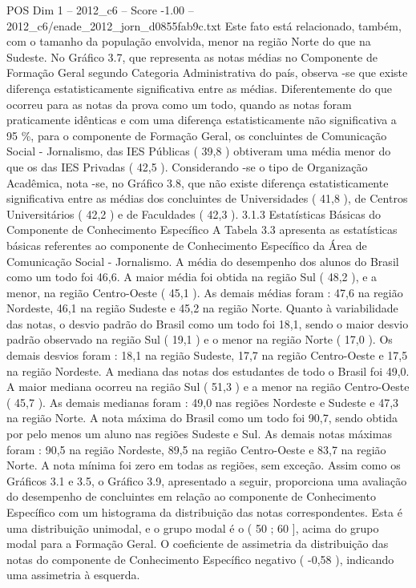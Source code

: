 \begin{textsample}{POS Dim 1 – 2012\_c6 – Score -1.00 – 2012\_c6/enade\_2012\_jorn\_d0855fab9c.txt}
Este fato está relacionado, também, com o tamanho da população envolvida, menor na região Norte do que na Sudeste.
No Gráfico 3.7, que representa as notas médias no Componente de Formação Geral segundo Categoria Administrativa do país, observa -se que existe diferença estatisticamente significativa entre as médias.
Diferentemente do que ocorreu para as notas da prova como um todo, quando as notas foram praticamente idênticas e com uma diferença estatisticamente não significativa a 95 \%, para o componente de Formação Geral, os concluintes de Comunicação Social - Jornalismo, das IES Públicas ( 39,8 ) obtiveram uma média menor do que os das IES Privadas ( 42,5 ).
Considerando -se o tipo de Organização Acadêmica, nota -se, no Gráfico 3.8, que não existe diferença estatisticamente significativa entre as médias dos concluintes de Universidades ( 41,8 ), de Centros Universitários ( 42,2 ) e de Faculdades ( 42,3 ). 3.1.3 Estatísticas Básicas do Componente de Conhecimento Específico A Tabela 3.3 apresenta as estatísticas básicas referentes ao componente de Conhecimento Específico da Área de Comunicação Social - Jornalismo.
A média do desempenho dos alunos do Brasil como um todo foi 46,6.
A maior média foi obtida na região Sul ( 48,2 ), e a menor, na região Centro-Oeste ( 45,1 ).
As demais médias foram : 47,6 na região Nordeste, 46,1 na região Sudeste e 45,2 na região Norte.
Quanto à variabilidade das notas, o desvio padrão do Brasil como um todo foi 18,1, sendo o maior desvio padrão observado na região Sul ( 19,1 ) e o menor na região Norte ( 17,0 ).
Os demais desvios foram : 18,1 na região Sudeste, 17,7 na região Centro-Oeste e 17,5 na região Nordeste.
A mediana das notas dos estudantes de todo o Brasil foi 49,0.
A maior mediana ocorreu na região Sul ( 51,3 ) e a menor na região Centro-Oeste ( 45,7 ).
As demais medianas foram : 49,0 nas regiões Nordeste e Sudeste e 47,3 na região Norte.
A nota máxima do Brasil como um todo foi 90,7, sendo obtida por pelo menos um aluno nas regiões Sudeste e Sul.
As demais notas máximas foram : 90,5 na região Nordeste, 89,5 na região Centro-Oeste e 83,7 na região Norte.
A nota mínima foi zero em todas as regiões, sem exceção.
Assim como os Gráficos 3.1 e 3.5, o Gráfico 3.9, apresentado a seguir, proporciona uma avaliação do desempenho de concluintes em relação ao componente de Conhecimento Específico com um histograma da distribuição das notas correspondentes.
Esta é uma distribuição unimodal, e o grupo modal é o ( 50 ; 60 ], acima do grupo modal para a Formação Geral.
O coeficiente de assimetria da distribuição das notas do componente de Conhecimento Específico negativo ( -0,58 ), indicando uma assimetria à esquerda.

\end{textsample}
